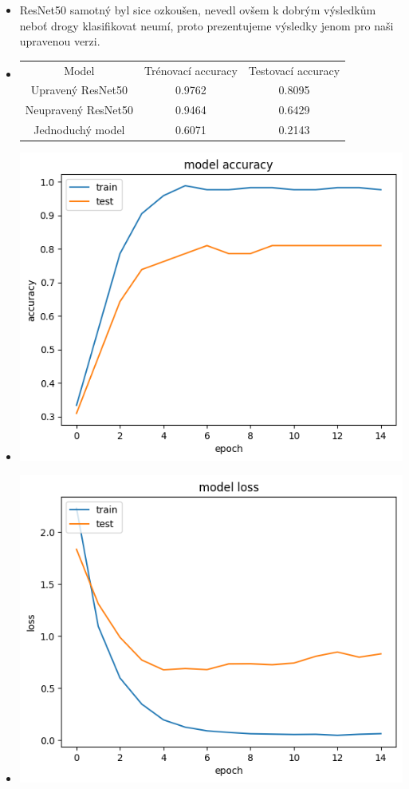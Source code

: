 \documentclass[a4paper]{article}
\newenvironment{ukol}[2][]{\begin{trivlist} 
\item[\hskip \labelsep {\bfseries #1}\hskip \labelsep {\bfseries #2}]}{\end{trivlist}}
\begin{document}
\begin{ukol}{Výsledky}
\begin{itemize}
	\item ResNet50 samotný byl sice ozkoušen, nevedl ovšem k dobrým výsledkům neboť drogy klasifikovat neumí, proto prezentujeme výsledky jenom pro naši upravenou verzi.
	\item \begin{center}
		\begin{tabular}{ c c c }
		Model & Trénovací accuracy & Testovací accuracy \\ 
		Upravený ResNet50 & 0.9762 & 0.8095  \\
		Neupravený ResNet50 & 0.9464 & 0.6429 \\
		Jednoduchý model & 0.6071 & 0.2143
		\end{tabular}
		\end{center}
	\item \includegraphics{accuracy}
	\item \includegraphics{loss}
\end{itemize}

\end{ukol}
\end{document}
